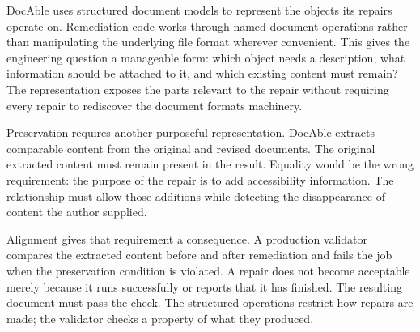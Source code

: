 
DocAble uses structured document models to represent the objects its repairs operate on. Remediation code works through named document operations rather than manipulating the underlying file format wherever convenient. This gives the engineering question a manageable form: which object needs a description, what information should be attached to it, and which existing content must remain? The representation exposes the parts relevant to the repair without requiring every repair to rediscover the document format\textquotesingle s machinery.


Preservation requires another purposeful representation. DocAble extracts comparable content from the original and revised documents. The original extracted content must remain present in the result. Equality would be the wrong requirement: the purpose of the repair is to add accessibility information. The relationship must allow those additions while detecting the disappearance of content the author supplied.


Alignment gives that requirement a consequence. A production validator compares the extracted content before and after remediation and fails the job when the preservation condition is violated. A repair does not become acceptable merely because it runs successfully or reports that it has finished. The resulting document must pass the check. The structured operations restrict how repairs are made; the validator checks a property of what they produced.


